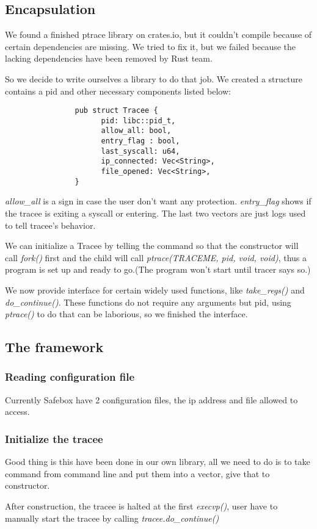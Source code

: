 \documentclass[conference,compsoc]{IEEEtran}
\begin{document}
	\subsection{Encapsulation}
		\par 
			We found a finished ptrace library on crates.io, but it couldn't compile because of certain dependencies are missing. 
			We tried to fix it, but we failed because the lacking dependencies have been removed by Rust team.
		\par
			So we decide to write ourselves a library to do that job. 
			We created a structure contains a pid and other necessary components listed below:
			\begin{verbatim}
				pub struct Tracee {
					  pid: libc::pid_t,
					  allow_all: bool,
					  entry_flag : bool,			
					  last_syscall: u64,
					  ip_connected: Vec<String>,
					  file_opened: Vec<String>,
				}
			\end{verbatim}
		\par
			\emph{allow\_all} is a sign in case the user don't want any protection. 
			\emph{entry\_flag} shows if the tracee is exiting a syscall or entering. 
			The last two vectors are just logs used to tell tracee's behavior.
		\par
			We can initialize a Tracee by telling the command so that the constructor will call \emph{fork()} first and the child will call \emph{ptrace(TRACEME, pid, void, void)}, thus a program is set up and ready to go.(The program won't start until tracer says so.)
		\par
			We now provide interface for certain widely used functions, like \emph{take\_regs()} and \emph{do\_continue()}. 
			These functions do not require any arguments but pid, using \emph{ptrace()} to do that can be laborious, so we finished the interface.
	\subsection{The framework}
		\subsubsection{Reading configuration file}
			Currently Safebox have 2 configuration files, the ip address and file allowed to access.
		\subsubsection{Initialize the tracee}
			\par
				Good thing is this have been done in our own library, all we need to do is to take command from command line and put them into a vector, give that to constructor. 
			\par
				After construction, the tracee is halted at the first \emph{execvp()}, user have to manually start the tracee by calling \emph{tracee.do\_continue()}
\end{document}
